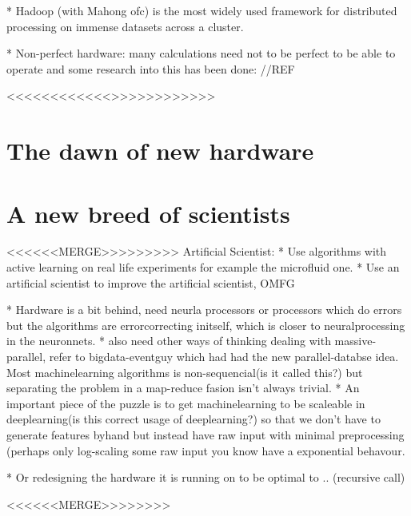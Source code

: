 \documentclass{article}
\begin{document}
    * Hadoop (with Mahong ofc) is the most widely used framework for
    distributed processing on immense datasets across a cluster. 

    * Non-perfect hardware: many calculations need not to be perfect to be able
    to operate and some research into this has been done: //REF


<<<<<<<<<<<<>>>>>>>>>>>>



\section{The dawn of new hardware}

    
        

\section{A new breed of scientists}

<<<<<<MERGE>>>>>>>>>
    Artificial Scientist: 
    * Use algorithms with active learning on real life experiments for example the
    microfluid one.
    * Use an artificial scientist to improve the artificial scientist, OMFG

    * Hardware is a bit  behind, need neurla processors or processors which do
    errors but the algorithms are errorcorrecting initself, which is closer to
    neuralprocessing in the neuronnets.
    * also need other ways of thinking dealing with massive-parallel, refer to
    bigdata-eventguy which had had the new parallel-databse idea. Most
    machinelearning algorithms is non-sequencial(is it called this?) but separating
    the problem in a map-reduce fasion isn't always trivial.
    * An important piece of the puzzle is to get machinelearning to be scaleable in
    deeplearning(is this correct usage of deeplearning?) so that we don't have to
    generate features byhand but instead have raw input with minimal preprocessing
    (perhaps only log-scaling some raw input you know have a exponential behavour.

    * Or redesigning the hardware it is running on to be optimal to .. (recursive
    call)

<<<<<<MERGE>>>>>>>>
\end{document}
